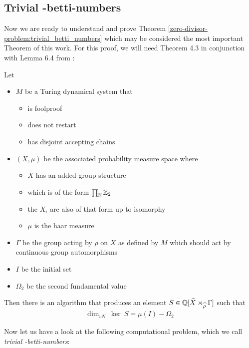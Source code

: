 \subsection{Trivial \ltwo-betti-numbers}
\label{the_zero_divisor_problem:main_theorem}

Now we are ready to understand and prove Theorem \ref{zero-divisor-problem:trivial_betti_numbers} which may be considered the most important Theorem of this work.
For this proof, we will need Theorem 4.3 in conjunction with Lemma 6.4 from \cite{gra14}:

\begin{Theorem}
	\label{the_zero_divisor_problem:grabowskis_theorem}
	Let
	\begin{itemize}
		\item{
			$M$ be a Turing dynamical system that
			\begin{itemize}
				\item is foolproof
				\item does not restart
				\item has disjoint accepting chains
			\end{itemize}
		}
		\item{
			$(X, \mu)$ be the associated probability measure space where
			\begin{itemize}
				\item $X$ has an added group structure
				\item which is of the form $\prod_{\mathbb{N}} \mathbb{Z}_2$
				\item the $X_i$ are also of that form up to isomorphy
				\item $\mu$ is the haar measure
			\end{itemize}
		}
		\item $\Gamma$ be the group acting by $\rho$ on $X$ as defined by $M$ which should act by continuous group automorphisms
		\item $I$ be the initial set
		\item $\Omega_2$ be the second fundamental value
	\end{itemize}

	Then there is an algorithm that produces an element $S \in \mathbb{Q}[\widehat{X} \rtimes_{\widehat{\rho}} \Gamma]$ such that
	\begin{align*}
		\dim_{vN} ~ \ker ~ S = \mu(I) - \Omega_2
	\end{align*}
\end{Theorem}

Now let us have a look at the following computational problem, which we call \emph{trivial \ltwo-betti-numbers}:

